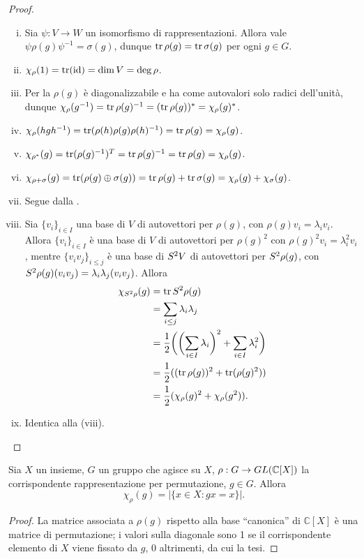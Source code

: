 \begin{proof}
\leavevmode
\begin{enumerate}[(i)]
\item Sia $\psi:V\to W$ un isomorfismo di rappresentazioni. Allora vale $\psi\rho(g)\psi^{-1}=\sigma(g)$, dunque $\operatorname{tr}\rho(g)=\operatorname{tr}\sigma(g)$ per ogni $g\in G$.
\item $\chi_\rho(1)=\operatorname{tr}(\operatorname{id})=\dim V=\deg\rho$.
\item Per la  $\rho(g)$ è diagonalizzabile e ha come autovalori solo radici dell'unità, dunque $\chi_\rho(g^{-1})=\operatorname{tr}\rho(g)^{-1}=(\operatorname{tr}\rho(g))^*=\chi_\rho(g)^*$.
\item $\chi_\rho(hgh^{-1})=\operatorname{tr}(\rho(h)\rho(g)\rho(h)^{-1})=\operatorname{tr}\rho(g)=\chi_\rho(g)$.
\item $\chi_{\rho^*}(g)=\operatorname{tr}(\rho(g)^{-1})^T=\operatorname{tr}\rho(g)^{-1}=\operatorname{tr}\rho(g)=\chi_\rho(g)$.
\item $\chi_{\rho+\sigma}(g)=\operatorname{tr}(\rho(g)\oplus\sigma(g))=\operatorname{tr}\rho(g)+\operatorname{tr}\sigma(g)=\chi_\rho(g)+\chi_\sigma(g)$.
\item Segue dalla .
\item Sia $\{v_i\}_{i\in I}$ una base di $V$ di autovettori per $\rho(g)$, con $\rho(g)v_i=\lambda_iv_i$. Allora $\{v_i\}_{i\in I}$ è una base di $V$ di autovettori per $\rho(g)^2$ con $\rho(g)^2v_i=\lambda_i^2v_i$, mentre $\{v_iv_j\}_{i\le j}$ è una base di $S^2V$ di autovettori per $S^2\rho(g)$, con $S^2\rho(g)(v_iv_j)=\lambda_i\lambda_j(v_iv_j)$. Allora
\begin{align*}
\chi_{S^2\rho}(g)&=\operatorname{tr}S^2\rho(g)\\
&=\sum_{i\le j}\lambda_i\lambda_j\\
&=\frac{1}{2}\biggl(\biggl(\sum_{i\in I}\lambda_i\biggr)^2+\sum_{i\in I}\lambda_i^2\biggr)\\
&=\frac{1}{2}((\operatorname{tr}\rho(g))^2+\operatorname{tr}(\rho(g)^2))\\
&=\frac{1}{2}(\chi_\rho(g)^2+\chi_\rho(g^2)).
\end{align*}
\item Identica alla (viii).
\end{enumerate}
\end{proof}

\begin{proposition}
Sia $X$ un insieme, $G$ un gruppo che agisce su $X$, $\rho:G\to GL(\mathbb{C}[X])$ la corrispondente rappresentazione per permutazione, $g\in G$. Allora
$$
\chi_\rho(g)=|\{x\in X:gx=x\}|.
$$
\end{proposition}
\begin{proof}
La matrice associata a $\rho(g)$ rispetto alla base ``canonica'' di $\mathbb{C}[X]$ è una matrice di permutazione; i valori sulla diagonale sono 1 se il corrispondente elemento di $X$ viene fissato da $g$, 0 altrimenti, da cui la tesi.
\end{proof}

